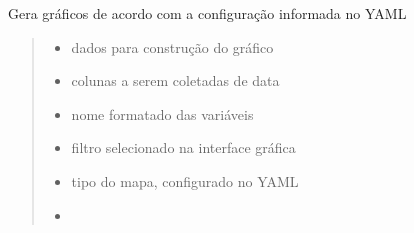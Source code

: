 \documentclass[letterpaper,10pt,brazil]{sphinxmanual}
\begin{document}
\begin{fulllineitems}
\label{\detokenize{pdcvis:app.addGrafico}}
\pysigstartsignatures
{}
\pysigstopsignatures
\sphinxAtStartPar
Gera gráficos de acordo com a configuração informada no YAML
\begin{quote}\begin{description}
\begin{itemize}
\item {} 
\sphinxAtStartPar
{} \textendash{} dados para construção do gráfico

\item {} 
\sphinxAtStartPar
{} \textendash{} colunas a serem coletadas de data

\item {} 
\sphinxAtStartPar
{} \textendash{} nome formatado das variáveis

\item {} 
\sphinxAtStartPar
{} \textendash{} filtro selecionado na interface gráfica

\item {} 
\sphinxAtStartPar
{} \textendash{} tipo do mapa, configurado no YAML

\item {} 
\sphinxAtStartPar
{} \textendash{} 

\end{itemize}

\end{description}\end{quote}

\end{fulllineitems}

\end{document}
